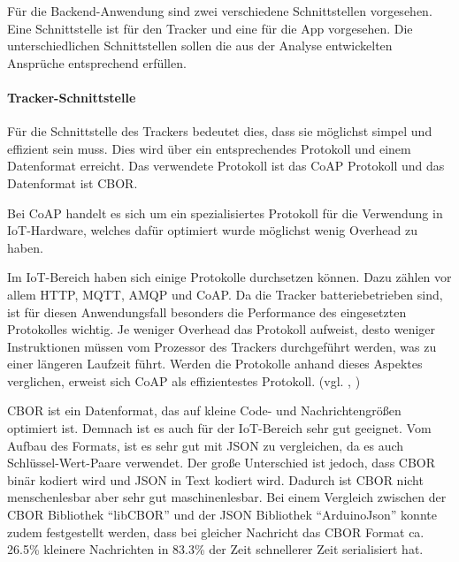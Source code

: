 Für die Backend-Anwendung sind zwei verschiedene Schnittstellen vorgesehen.
Eine Schnittstelle ist für den Tracker und eine für die App vorgesehen.
Die unterschiedlichen Schnittstellen sollen die aus der Analyse entwickelten Ansprüche entsprechend erfüllen.

\paragraph{Tracker-Schnittstelle} \label{par:tracker-schnittstelle}
Für die Schnittstelle des Trackers bedeutet dies, dass sie möglichst simpel und effizient sein muss.
Dies wird über ein entsprechendes Protokoll und einem Datenformat erreicht.
Das verwendete Protokoll ist das \acrfull{CoAP} Protokoll und das Datenformat ist \acrfull{CBOR}.

Bei \gls{CoAP} handelt es sich um ein spezialisiertes Protokoll für die Verwendung in
\gls{IoT}-Hardware, welches dafür optimiert wurde möglichst wenig \gls{Overhead} zu haben.

Im \gls{IoT}-Bereich haben sich einige Protokolle durchsetzen können. Dazu zählen vor allem
\gls{HTTP}, \gls{MQTT}, \gls{AMQP} und \gls{CoAP}.
Da die Tracker batteriebetrieben sind, ist für diesen Anwendungsfall besonders die Performance des
eingesetzten Protokolles wichtig. Je weniger Overhead das Protokoll aufweist, desto weniger
Instruktionen müssen vom Prozessor des Trackers durchgeführt werden, was zu einer längeren Laufzeit
führt.
Werden die Protokolle anhand dieses Aspektes verglichen, erweist sich \gls{CoAP} als effizientestes
Protokoll. (vgl. \cite{Dizdarevic2019}, \cite{Naik2017})

\gls{CBOR} ist ein Datenformat, das auf kleine Code- und Nachrichtengrößen optimiert ist.
Demnach ist es auch für der \gls{IoT}-Bereich sehr gut geeignet.
Vom Aufbau des Formats, ist es sehr gut mit \gls{JSON} zu vergleichen, da es auch Schlüssel-Wert-Paare verwendet.
Der große Unterschied ist jedoch, dass \gls{CBOR} binär kodiert wird und \gls{JSON} in Text kodiert wird.
Dadurch ist \gls{CBOR} nicht menschenlesbar aber sehr gut maschinenlesbar.
Bei einem Vergleich zwischen der \gls{CBOR} Bibliothek \enquote{libCBOR} und der \gls{JSON} Bibliothek \enquote{ArduinoJson}
konnte zudem festgestellt werden, dass bei gleicher Nachricht das \gls{CBOR} Format ca. 26.5\% kleinere Nachrichten
in 83.3\% der Zeit schnellerer Zeit serialisiert hat.


